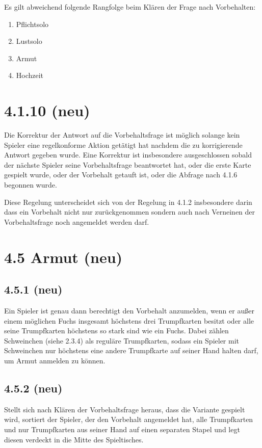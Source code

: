 Es gilt abweichend folgende Rangfolge beim Klären der Frage nach
Vorbehalten:

\begin{enumerate}
    \item Pflichtsolo
    \item Lustsolo
    \item Armut
    \item Hochzeit
\end{enumerate}

\section*{4.1.10 (neu)}

Die Korrektur der Antwort auf die Vorbehaltsfrage ist möglich solange kein
Spieler eine regelkonforme Aktion getätigt hat nachdem die zu korrigierende Antwort gegeben
wurde. Eine Korrektur ist insbesondere ausgeschlossen sobald der nächste Spieler seine Vorbehaltsfrage beantwortet
hat, oder die erste Karte gespielt wurde, oder der Vorbehalt getauft ist, oder
die Abfrage nach 4.1.6 begonnen wurde.

Diese Regelung unterscheidet sich von der Regelung in 4.1.2 insbesondere
darin dass ein Vorbehalt nicht nur zurückgenommen sondern auch nach Verneinen
der Vorbehaltsfrage noch angemeldet werden darf.

\section*{4.5 Armut (neu)}

\subsection*{4.5.1 (neu)}
Ein Spieler ist genau dann berechtigt den Vorbehalt 
anzumelden, wenn er außer einem möglichen Fuchs insgesamt höchstens
drei Trumpfkarten besitzt oder alle seine Trumpfkarten höchstens so
stark sind wie ein Fuchs. Dabei zählen Schweinchen (siehe 2.3.4) als
reguläre Trumpfkarten, sodass ein Spieler mit Schweinchen nur
höchstens eine andere Trumpfkarte auf seiner Hand halten darf, um Armut
anmelden zu können.

\subsection*{4.5.2 (neu)}

Stellt sich nach Klären der Vorbehaltsfrage heraus, dass die Variante
 gespielt wird, sortiert der Spieler, der den Vorbehalt
angemeldet hat, alle Trumpfkarten und nur Trumpfkarten aus seiner Hand
auf einen separaten Stapel und legt diesen verdeckt in die Mitte des
Spieltisches.

